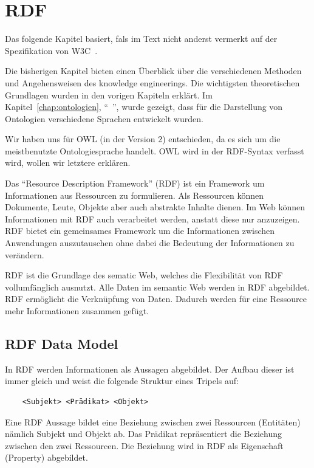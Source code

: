 \chapter{RDF}
\label{chap:rdf}
Das folgende Kapitel basiert, fals im Text nicht anderst vermerkt auf der Spezifikation von W3C~\cite{w3rdf}.

Die bisherigen Kapitel bieten einen Überblick über die verschiedenen Methoden und Angehensweisen des knowledge engineerings. Die wichtigsten theoretischen Grundlagen wurden in den vorigen Kapiteln erklärt. Im Kapitel~\ref{chap:ontologien}, ``~'', wurde gezeigt, dass für die Darstellung von Ontologien verschiedene Sprachen entwickelt wurden. 

Wir haben uns für OWL (in der Version 2) entschieden, da es sich um die meistbenutzte Ontologiesprache handelt. OWL wird in der RDF-Syntax verfasst wird, wollen wir letztere erklären.

Das ``Resource Description Framework'' (RDF) ist ein Framework um Informationen aus Ressourcen zu formulieren. Als Ressourcen können Dokumente, Leute, Objekte aber auch abstrakte Inhalte dienen. Im Web können Informationen mit RDF auch verarbeitet werden, anstatt diese nur anzuzeigen. RDF bietet ein gemeinsames Framework um die Informationen zwischen Anwendungen auszutauschen ohne dabei die Bedeutung der Informationen zu verändern.

RDF ist die Grundlage des sematic Web, welches die Flexibilität von RDF vollumfänglich ausnutzt. Alle Daten im semantic Web werden in RDF abgebildet. RDF ermöglicht die Verknüpfung von Daten. Dadurch werden für eine Ressource mehr Informationen zusammen gefügt.\cite{cambSemRDF}

\section{RDF Data Model}
\label{sec:rdf_rdf_dataModel}
In RDF werden Informationen als Aussagen abgebildet. Der Aufbau dieser ist immer gleich und weist die folgende Struktur eines Tripels auf:

\begin{lstlisting}
    <Subjekt> <Prädikat> <Objekt>
\end{lstlisting}

Eine RDF Aussage bildet eine Beziehung zwischen zwei Ressourcen (Entitäten) nämlich Subjekt und Objekt ab. Das Prädikat repräsentiert die Beziehung zwischen den zwei Ressourcen. Die Beziehung wird in RDF als Eigenschaft (Property) abgebildet.

